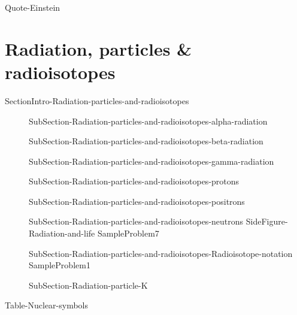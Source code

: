 \documentclass[main.tex]{subfiles}
\begin{document}
  {Quote-Einstein}





\section{Radiation, particles \& radioisotopes}{SectionIntro-Radiation-particles-and-radioisotopes}
\sloppy \begin{description}
\item[] {SubSection-Radiation-particles-and-radioisotopes-alpha-radiation}
\item[] {SubSection-Radiation-particles-and-radioisotopes-beta-radiation}
\item[] {SubSection-Radiation-particles-and-radioisotopes-gamma-radiation}
\item[] {SubSection-Radiation-particles-and-radioisotopes-protons}
\item[] {SubSection-Radiation-particles-and-radioisotopes-positrons}
\item[] {SubSection-Radiation-particles-and-radioisotopes-neutrons}
{SideFigure-Radiation-and-life}
  {SampleProblem7}
\item[]  {SubSection-Radiation-particles-and-radioisotopes-Radioisotope-notation}
  {SampleProblem1}

\item[]  {SubSection-Radiation-particle-K}

\end{description}
\hspace{0cm}\begin{fullwidth}{Table-Nuclear-symbols}\end{fullwidth}

 
 
 
 
 
\end{document}
